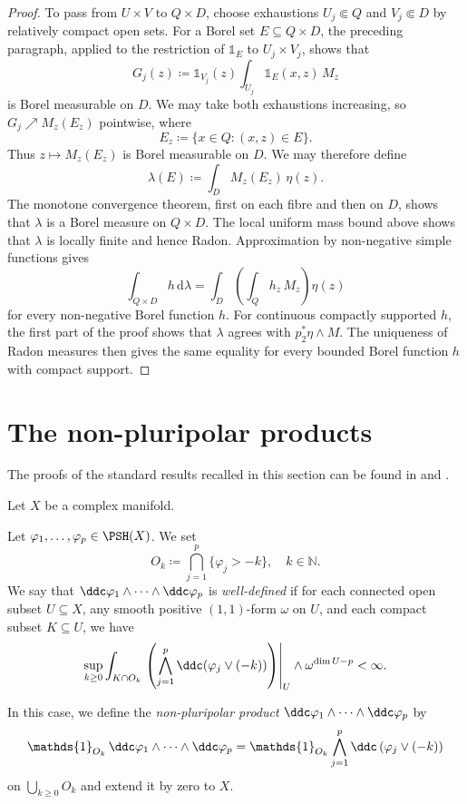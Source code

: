 \begin{proof}
    To pass from $U\times V$ to $Q\times D$, choose exhaustions $U_j\Subset Q$ and $V_j\Subset D$ by relatively compact open sets. For a Borel set $E\subseteq Q\times D$, the preceding paragraph, applied to the restriction of $\mathds{1}_E$ to $U_j\times V_j$, shows that
    \[
        G_j(z)\coloneqq
        \mathds{1}_{V_j}(z)\int_{U_j}\mathds{1}_E(x,z)\,M_z
    \]
    is Borel measurable on $D$. We may take both exhaustions increasing, so $G_j\nearrow M_z(E_z)$ pointwise, where
    \[
        E_z\coloneqq\{x\in Q:(x,z)\in E\}.
    \]
    Thus $z\mapsto M_z(E_z)$ is Borel measurable on $D$.
    We may therefore define
    \[
        \lambda(E)\coloneqq\int_D M_z(E_z)\,\eta(z).
    \]
    The monotone convergence theorem, first on each fibre and then on $D$, shows that $\lambda$ is a Borel measure on $Q\times D$. The local uniform mass bound above shows that $\lambda$ is locally finite and hence Radon. Approximation by non-negative simple functions gives
    \[
        \int_{Q\times D}h\,\mathrm{d}\lambda
        =\int_D\left(\int_Qh_z\,M_z\right)\eta(z)
    \]
    for every non-negative Borel function $h$. For continuous compactly supported $h$, the first part of the proof shows that $\lambda$ agrees with $p_2^*\eta\wedge M$. The uniqueness of Radon measures then gives the same equality for every bounded Borel function $h$ with compact support.
\end{proof}

\section{The non-pluripolar products}\label{sec:npp}
The proofs of the standard results recalled in this section can be found in \cite{BEGZ10} and \cite[Sections~15.1--15.5]{FPT}.

Let $X$ be a complex manifold.

\begin{definition}\label{def:npp:L69}
Let $\varphi_1,\ldots,\varphi_p\in \PSH(X)$. We set
\[
O_k \coloneqq \bigcap_{j=1}^p \{\varphi_j>-k\},\quad k\in \mathbb{N}.
\]
We say that $\ddc \varphi_1\wedge\cdots\wedge \ddc \varphi_p$ is \emph{well-defined} if for each connected open subset $U\subseteq X$, any smooth positive $(1,1)$-form $\omega$ on $U$, and each compact subset $K\subseteq U$, we have
\begin{equation}\label{eq:welldefinepluri}
\sup_{k\geq 0} \int_{K\cap O_k}\left.\left(\bigwedge_{j=1}^p \ddc (\varphi_j\lor (-k))\right)\right|_U\wedge \omega^{\dim U-p}<\infty.
\end{equation}

In this case, we define the \emph{non-pluripolar product}  $\ddc \varphi_1\wedge\cdots\wedge \ddc \varphi_p$ by
\begin{equation}\label{eq:npp}
\mathds{1}_{O_k}\,\ddc \varphi_1\wedge\cdots\wedge \ddc \varphi_p=\mathds{1}_{O_k}\bigwedge_{j=1}^p \ddc  \left( \varphi_j\lor (-k)\right)
\end{equation}
on $\bigcup_{k\geq 0} O_k$ and extend it by zero to $X$.
\end{definition}

